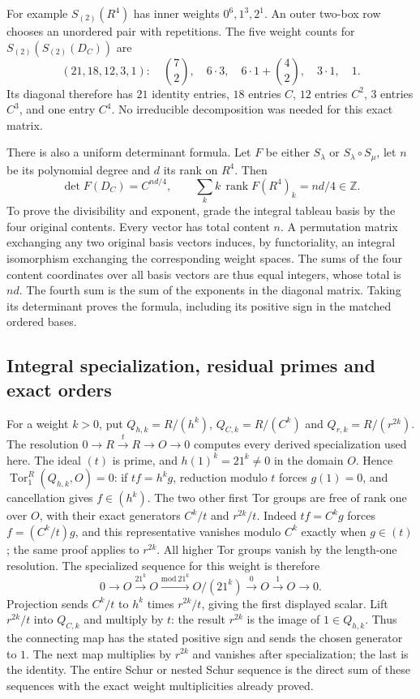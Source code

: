 For example $S_{(2)}(R^4)$ has inner weights $0^6,1^3,2^1$.
An outer two-box row chooses an unordered pair with repetitions.
The five weight counts for $S_{(2)}(S_{(2)}(D_C))$ are
\[
 (21,18,12,3,1):\quad
 \binom72,\quad6\cdot3,\quad6\cdot1+\binom42,\quad3\cdot1,\quad1.
\]
Its diagonal therefore has $21$ identity entries, $18$ entries $C$,
$12$ entries $C^2$, $3$ entries $C^3$, and one entry $C^4$.
No irreducible decomposition was needed for this exact matrix.

There is also a uniform determinant formula. Let $F$ be either
$S_\lambda$ or $S_\lambda\circ S_\mu$, let $n$ be its polynomial
degree and $d$ its rank on $R^4$. Then
\begin{equation}\label{eq:plethysm-determinant}
 \det F(D_C)=C^{nd/4},\qquad
 \sum_k k\,\operatorname{rank}F(R^4)_k=nd/4\in\mathbb Z.
\end{equation}
To prove the divisibility and exponent, grade the integral tableau
basis by the four original contents. Every vector has total content
$n$. A permutation matrix exchanging any two original basis vectors
induces, by functoriality, an integral isomorphism exchanging the
corresponding weight spaces. The sums of the four content coordinates
over all basis vectors are thus equal integers, whose total is $nd$.
The fourth sum is the sum of the exponents in the diagonal matrix.
Taking its determinant proves the formula, including its positive sign
in the matched ordered bases.

\subsection{Integral specialization, residual primes and exact orders}

For a weight $k>0$, put $Q_{h,k}=R/(h^k)$,
$Q_{C,k}=R/(C^k)$ and $Q_{r,k}=R/(r^{2k})$.
The resolution $0\to R\xrightarrow{t}R\to O\to0$ computes every
derived specialization used here. The ideal $(t)$ is prime, and
$h(1)^k=21^k\ne0$ in the domain $O$. Hence
$\operatorname{Tor}_1^R(Q_{h,k},O)=0$: if $tf=h^kg$, reduction modulo
$t$ forces $g(1)=0$, and cancellation gives $f\in(h^k)$.
The two other first Tor groups are free of rank one over $O$,
with their exact generators $C^k/t$ and $r^{2k}/t$. Indeed
$tf=C^kg$ forces $f=(C^k/t)g$, and this representative vanishes
modulo $C^k$ exactly when $g\in(t)$; the same proof applies to
$r^{2k}$. All higher Tor groups vanish by the length-one resolution.
The specialized sequence for this weight is therefore
\begin{equation}\label{eq:plethysm-derived-21}
 0\longrightarrow O\xrightarrow{21^k}O
 \xrightarrow{\mathrm{mod}\ 21^k}O/(21^k)
 \xrightarrow{0}O\xrightarrow{1}O\longrightarrow0.
\end{equation}
Projection sends $C^k/t$ to $h^k$ times $r^{2k}/t$, giving the
first displayed scalar. Lift $r^{2k}/t$ into $Q_{C,k}$ and multiply
by $t$: the result $r^{2k}$ is the image of $1\in Q_{h,k}$.
Thus the connecting map has the stated positive sign and sends the
chosen generator to $1$. The next map multiplies by $r^{2k}$ and
vanishes after specialization; the last is the identity.
The entire Schur or nested Schur sequence is the direct sum of
these sequences with the exact weight multiplicities already proved.

